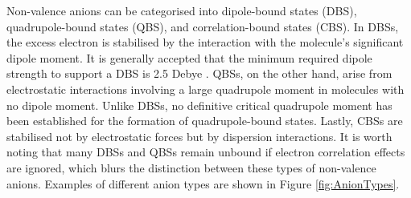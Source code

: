 Non-valence anions can be categorised into dipole-bound states (DBS)\cite{fermi1947capture,desfranccois1996abdoul,gutowski1996contribution,jordan2003theory,qian2019probing}, quadrupole-bound states (QBS)\cite{jordan1979binding,desfranccois2004long,sommerfeld2014excess}, and correlation-bound states (CBS)\cite{sommerfeld2010correlation,voora2013existence,voora2014nonvalence,voora2017theoretical}.
In DBSs, the excess electron is stabilised by the interaction with the molecule's significant dipole moment. It is generally accepted that the minimum required dipole strength to support a DBS is 2.5 Debye \cite{jordan2003theory}. QBSs, on the other hand, arise from electrostatic interactions involving a large quadrupole moment in molecules with no dipole moment. Unlike DBSs, no definitive critical quadrupole moment has been established for the formation of quadrupole-bound states\cite{sommerfeld2014excess}. Lastly, CBSs are stabilised not by electrostatic forces but by dispersion interactions. It is worth noting that many DBSs and QBSs remain unbound if electron correlation effects are ignored, which blurs the distinction between these types of non-valence anions\cite{voora2017theoretical}. Examples of different anion types are shown in Figure \ref{fig:AnionTypes}.


